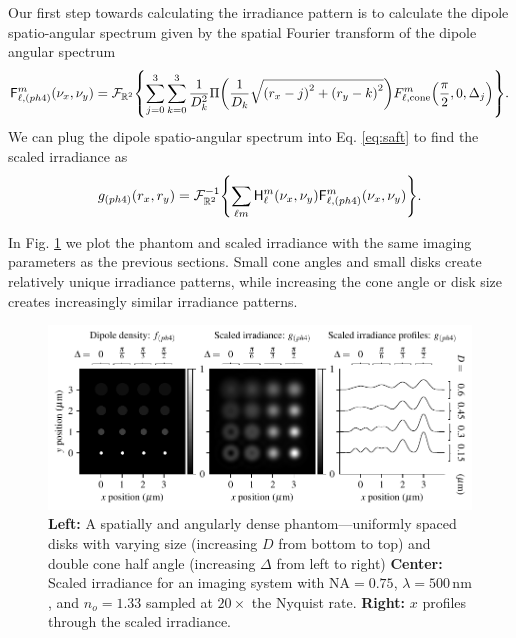 \documentclass[]{osa-article}
\let\originalleft\left
\let\originalright\right
\renewcommand{\left}{\mathopen{}\mathclose\bgroup\originalleft}
\renewcommand{\right}{\aftergroup\egroup\originalright}
\providecommand{\mc}[1]{\mathcal{#1}}
\providecommand{\mbb}[1]{\mathbb{#1}}
\begin{document}
 Our first step towards calculating the irradiance pattern is to calculate the
 dipole spatio-angular spectrum given by the spatial Fourier transform of the dipole angular spectrum  
  \begin{align}
   \mathsf{F}_{\ell,(ph4)}^m(\nu_x, \nu_y) = \mc{F}_{\mbb{R}^2}\left\{\sum_{j=0}^3 \sum_{k=0}^3 \frac{1}{D_k^2}\Pi\left(\frac{1}{D_k}\sqrt{\left(r_x - j\right)^2 + \left(r_y - k\right)^2}\right)F_{\ell,\text{cone}}^m\left(\frac{\pi}{2}, 0, \Delta_j\right)\right\}.
  \end{align}
  We can plug the dipole spatio-angular spectrum into Eq. \eqref{eq:saft} to find
  the scaled irradiance as 
  \begin{align}
   g_{(ph4)}(r_x, r_y) = \mc{F}^{-1}_{\mbb{R}^2}\left\{\sum_{\ell m}\mathsf{H}_{\ell}^m(\nu_x, \nu_y)\mathsf{F}_{\ell,(ph4)}^m(\nu_x, \nu_y)\right\}.
  \end{align}

  In Fig. \ref{fig:ph4} we plot the phantom and scaled irradiance with the
  same imaging parameters as the previous sections. Small cone angles and small
  disks create relatively unique irradiance patterns, while increasing the cone
  angle or disk size creates increasingly similar irradiance patterns. 
  
  \begin{figure}[h]
 \centering
   \centering
   \includegraphics[scale=0.8]{../figures/paratfs/ph4.pdf}
   \caption{\textbf{Left:} A spatially and angularly dense phantom---uniformly
     spaced disks with varying size (increasing $D$ from bottom to top) and
     double cone half angle (increasing $\Delta$ from left to right)
     \textbf{Center:} Scaled irradiance for an imaging system with
     $\text{NA} = 0.75$, $\lambda = 500\,\text{nm}$, and $n_o = 1.33$ sampled at
     $20\times$ the Nyquist rate. \textbf{Right:} $x$ profiles through the
     scaled irradiance.}
   \label{fig:ph4}
 \end{figure}
 
\end{document}
